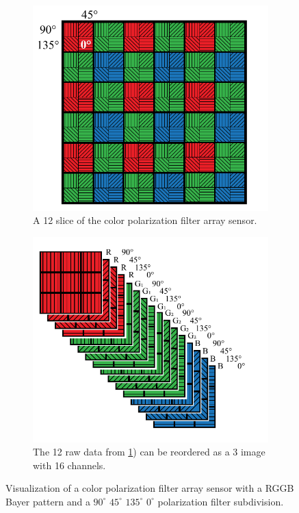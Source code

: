 \begin{figure}[H]
    \begin{subfigure}[T]{.48\textwidth}
        \includegraphics[width=\textwidth]{figures/sensor_layout.pdf}
        \caption{A 12 slice of the color polarization filter array sensor. \label{fig:cpfa}}
    \end{subfigure}%
    \hfill
    \begin{subfigure}[T]{.48\textwidth}
        \includegraphics[width=\textwidth]{figures/sensor_packaging.pdf}
        \caption{The 12 raw data from \ref{fig:cpfa}) can be reordered as a 3 image with 16 channels.}
    \end{subfigure}
    \caption{Visualization of a color polarization filter array sensor with a RGGB Bayer pattern and a $90^\circ$ $45^\circ$ $135^\circ$ $0^\circ$ polarization filter subdivision.
        \label{fig:polarization_naming}}
\end{figure}

